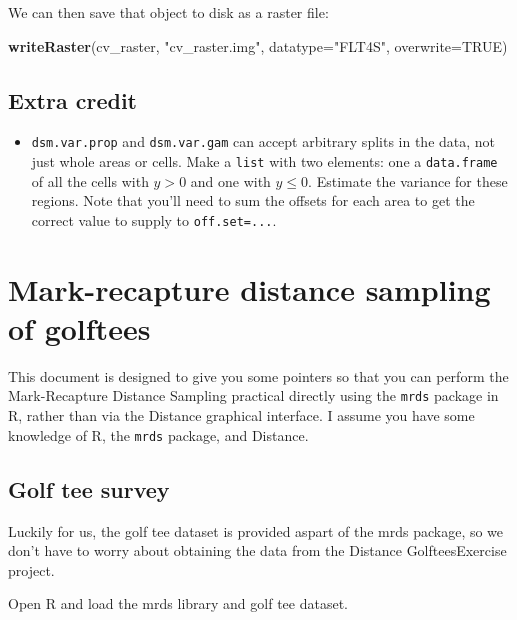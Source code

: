 \documentclass[]{book}
\newenvironment{Shaded}{\begin{snugshade}}{\end{snugshade}}
\newcommand{\KeywordTok}[1]{\textcolor[rgb]{0.13,0.29,0.53}{\textbf{#1}}}
\newcommand{\DataTypeTok}[1]{\textcolor[rgb]{0.13,0.29,0.53}{#1}}
\newcommand{\StringTok}[1]{\textcolor[rgb]{0.31,0.60,0.02}{#1}}
\newcommand{\OtherTok}[1]{\textcolor[rgb]{0.56,0.35,0.01}{#1}}
\newcommand{\NormalTok}[1]{#1}
\providecommand{\tightlist}{%
  \setlength{\itemsep}{0pt}\setlength{\parskip}{0pt}}
\theoremstyle{definition}
\theoremstyle{definition}
\theoremstyle{remark}
\begin{document}
We can then save that object to disk as a raster file:

\begin{Shaded}
\begin{Highlighting}[]
\KeywordTok{writeRaster}\NormalTok{(cv_raster, }\StringTok{"cv_raster.img"}\NormalTok{, }\DataTypeTok{datatype=}\StringTok{"FLT4S"}\NormalTok{, }\DataTypeTok{overwrite=}\OtherTok{TRUE}\NormalTok{)}
\end{Highlighting}
\end{Shaded}

\section{Extra credit}\label{extra-credit-2}

\begin{itemize}
\tightlist
\item
  \texttt{dsm.var.prop} and \texttt{dsm.var.gam} can accept arbitrary
  splits in the data, not just whole areas or cells. Make a
  \texttt{list} with two elements: one a \texttt{data.frame} of all the
  cells with \(y>0\) and one with \(y\leq 0\). Estimate the variance for
  these regions. Note that you'll need to sum the offsets for each area
  to get the correct value to supply to \texttt{off.set=...}.
\end{itemize}

\chapter{Mark-recapture distance sampling of
golftees}\label{mark-recapture-distance-sampling-of-golftees}

This document is designed to give you some pointers so that you can
perform the Mark-Recapture Distance Sampling practical directly using
the \texttt{mrds} package in R, rather than via the Distance graphical
interface. I assume you have some knowledge of R, the \texttt{mrds}
package, and Distance.

\section{Golf tee survey}\label{golf-tee-survey}

Luckily for us, the golf tee dataset is provided aspart of the mrds
package, so we don't have to worry about obtaining the data from the
Distance GolfteesExercise project.

Open R and load the mrds library and golf tee dataset.
\end{document}
